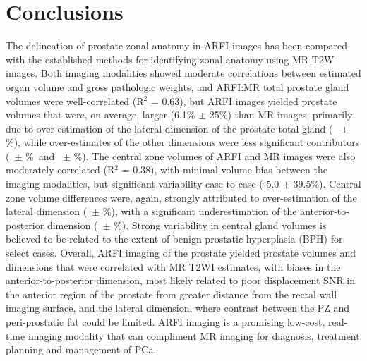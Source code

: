 \section{Conclusions}
The delineation of prostate zonal anatomy in ARFI images has been compared with
the established methods for identifying zonal anatomy using MR T2W images.
Both imaging modalities showed moderate correlations between estimated organ
volume and gross pathologic weights, and ARFI:MR total prostate gland volumes
were well-correlated (R$^2$ = 0.63), but ARFI images yielded prostate volumes
that were, on average, larger (6.1\% $\pm$ 25\%) than MR images, primarily due
to over-estimation of the lateral dimension of the prostate total gland
(\ARFImrTotalLatLatMeanPct~ $\pm$ \ARFImrTotalLatLatStdPct\%), while
over-estimates of the other dimensions were less significant contributors
(\ARFImrTotalAntPostMeanPct~$\pm$ \ARFImrTotalAntPostStdPct\%~and
\ARFImrTotalApexBaseMeanPct~$\pm$ \ARFImrTotalApexBaseStdPct\%).  The central
zone volumes of ARFI and MR images were also moderately correlated (R$^2$ =
0.38), with minimal volume bias between the imaging modalities, but significant
variability case-to-case (-5.0 $\pm$ 39.5\%).  Central zone volume differences
were, again, strongly attributed to over-estimation of the lateral dimension
(\ARFImrCentralLatLatMeanPct~$\pm$ \ARFImrCentralLatLatStdPct\%), with a
significant underestimation of the anterior-to-posterior dimension
(\ARFImrCentralAntPostMeanPct~$\pm$ \ARFImrCentralAntPostStdPct\%).  Strong
variability in central gland volumes is believed to be related to the extent of
benign prostatic hyperplasia (BPH) for select cases.  Overall, ARFI imaging of
the prostate yielded prostate volumes and dimensions that were correlated with
MR T2WI estimates, with biases in the anterior-to-posterior dimension, most
likely related to poor displacement SNR in the anterior region of the prostate
from greater distance from the rectal wall imaging surface, and the lateral
dimension, where contrast between the PZ and peri-prostatic fat could be
limited.  ARFI imaging is a promising low-cost, real-time imaging modality that
can compliment MR imaging for diagnosis, treatment planning and management of
PCa.
